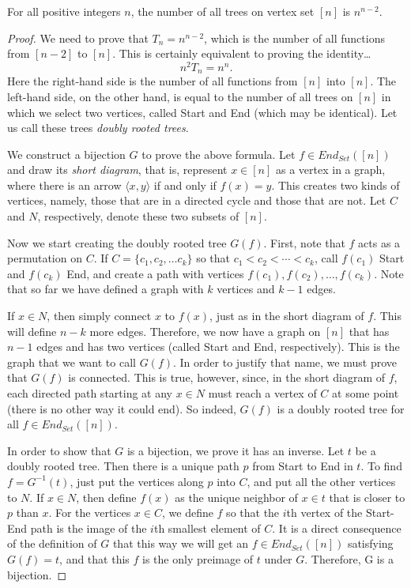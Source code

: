 \begin{theorem}
For all positive integers $n$, the number of all trees on vertex set $[n]$ is $n^{n-2}$.
\end{theorem}

\begin{proof}
We need to prove that $T_n = n^{n-2}$, which is the number of all functions from $[n-2]$ to $[n]$. This is certainly equivalent to proving the identity\dots
$$n^2 T_n = n^n.$$
Here the right-hand side is the number of all functions from $[n]$ into $[n]$. The left-hand side, on the other hand, is equal to the number of all trees on $[n]$
in which we select two vertices, called Start and End (which may be identical). Let us call these trees \emph{doubly rooted trees}.

We construct a bijection $G$ to prove the above formula. Let $f \in End_{Set}([n])$ and draw its \emph{short diagram}, that is, represent $x \in [n]$ as a vertex in a graph, where there is an arrow $\langle x,y \rangle$ if and only if $f(x) = y$.
This creates two kinds of vertices, namely, those that are in a directed cycle and those that are not. Let $C$ and $N$, respectively, denote these two subsets of $[n]$.

Now we start creating the doubly rooted tree $G(f)$. First, note that $f$ acts as a permutation on $C$. If $C = \{ c_1, c_2, \dots c_k \}$ so that $c_1 < c_2 < \cdots < c_k$, call $f(c_1)$ Start and $f(c_k)$ End, and create a path with vertices
$f(c_1),f(c_2),\dots,f(c_k)$. Note that so far we have defined a graph with $k$ vertices and $k-1$ edges.

If $x \in N$, then simply connect $x$ to $f(x)$, just as in the short diagram of $f$. This will define $n-k$ more edges. Therefore, we now have a graph on $[n]$ that has $n-1$ edges and has two vertices (called Start and End, respectively).
This is the graph that we want to call $G(f)$. In order to justify that name, we must prove that $G(f)$ is connected. This is true, however, since, in the short diagram of $f$, each directed path starting at any $x \in N$ must reach a vertex of $C$
at some point (there is no other way it could end). So indeed, $G(f)$ is a doubly rooted tree for all $f \in End_{Set}([n])$.

In order to show that $G$ is a bijection, we prove it has an inverse. Let $t$ be a doubly rooted tree. Then there is a unique path $p$ from Start to End in $t$. To find $f = G^{-1}(t)$, just put the vertices along $p$ into $C$, and put all the other
vertices to $N$. If $x \in N$, then define $f(x)$ as the unique neighbor of $x \in t$ that is closer to $p$ than $x$. For the vertices $x \in C$, we define $f$ so that the $i$th vertex of the Start-End path is the image of the $i$th smallest element of $C$.
It is a direct consequence of the definition of $G$ that this way we will get an $f \in End_{Set}([n])$ satisfying $G(f) = t$, and that this $f$ is the only preimage of $t$ under $G$. Therefore, G is a bijection.
\end{proof}